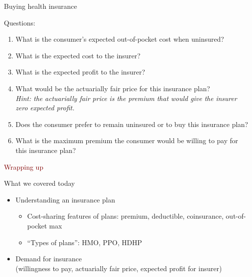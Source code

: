 \begin{frame}{Buying health insurance}

    Questions:
    \begin{enumerate}
        \item What is the consumer's expected out-of-pocket cost when uninsured?
        \item What is the expected cost to the insurer?
        \item What is the expected profit to the insurer?
        \item What would be the actuarially fair price for this insurance plan?\\
        \textit{Hint: the actuarially fair price is the premium that would give the insurer zero expected profit.}
        \item Does the consumer prefer to remain uninsured or to buy this insurance plan?
        \item What is the maximum premium the consumer would be willing to pay for this insurance plan?
    \end{enumerate}

\end{frame}
\begin{frame}{}
    \begin{center}
    \Large \textcolor{maroon}{Wrapping up}
    \end{center}

\end{frame}
\begin{frame}{What we covered today}
        \begin{itemize}
        \item Understanding an insurance plan
        \begin{itemize}
            \item Cost-sharing features of plans: premium, deductible, coinsurance, out-of-pocket max
            \item ``Types of plans'': HMO, PPO, HDHP
        \end{itemize}
        \item Demand for insurance\\
        {\small (willingness to pay, actuarially fair price, expected profit for insurer)}
    \end{itemize}
\end{frame}
